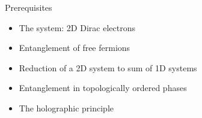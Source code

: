 \documentclass[12pt,aspectratio=169]{beamer}
\begin{document}
\begin{frame}{Prerequisites}
	\begin{itemize}
		\item The system: 2D Dirac electrons\\[10pt]
		\item Entanglement of free fermions\\[10pt]
		\item Reduction of a 2D system to sum of 1D systems\\[10pt]
		\item Entanglement in topologically ordered phases\\[10pt]
		\item The holographic principle
	\end{itemize}
\end{frame}
\end{document}
